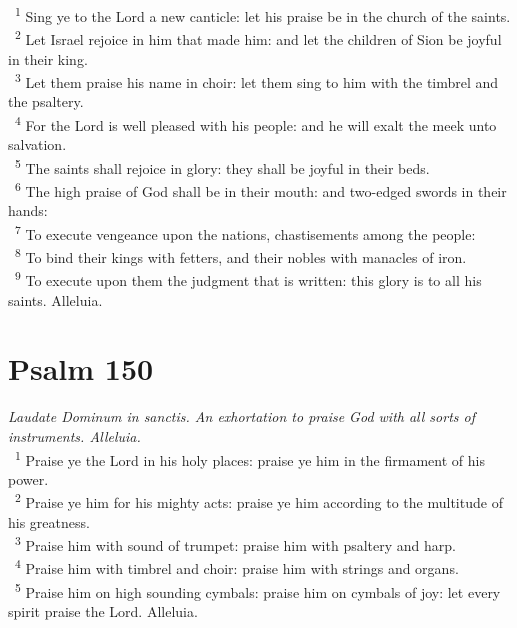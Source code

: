 \documentclass[a5paper,12pt]{article}
\begin{document}
\begin{multicols*}{2}
~\textsuperscript{1} Sing ye to the Lord a new canticle: let his praise be in the church of the saints.\\
~\textsuperscript{2} Let Israel rejoice in him that made him: and let the children of Sion be joyful in their king.\\
~\textsuperscript{3} Let them praise his name in choir: let them sing to him with the timbrel and the psaltery.\\
~\textsuperscript{4} For the Lord is well pleased with his people: and he will exalt the meek unto salvation.\\
~\textsuperscript{5} The saints shall rejoice in glory: they shall be joyful in their beds.\\
~\textsuperscript{6} The high praise of God shall be in their mouth: and two-edged swords in their hands:\\
~\textsuperscript{7} To execute vengeance upon the nations, chastisements among the people:\\
~\textsuperscript{8} To bind their kings with fetters, and their nobles with manacles of iron.\\
~\textsuperscript{9} To execute upon them the judgment that is written: this glory is to all his saints. Alleluia.\\

\section{Psalm 150}
\label{sec:orgfa38a04}
\emph{Laudate Dominum in sanctis. An exhortation to praise God with all sorts of instruments. Alleluia.}\\

~\textsuperscript{1} Praise ye the Lord in his holy places: praise ye him in the firmament of his power.\\
~\textsuperscript{2} Praise ye him for his mighty acts: praise ye him according to the multitude of his greatness.\\
~\textsuperscript{3} Praise him with sound of trumpet: praise him with psaltery and harp.\\
~\textsuperscript{4} Praise him with timbrel and choir: praise him with strings and organs.\\
~\textsuperscript{5} Praise him on high sounding cymbals: praise him on cymbals of joy: let every spirit praise the Lord. Alleluia.\\

\end{multicols*}
\end{document}
